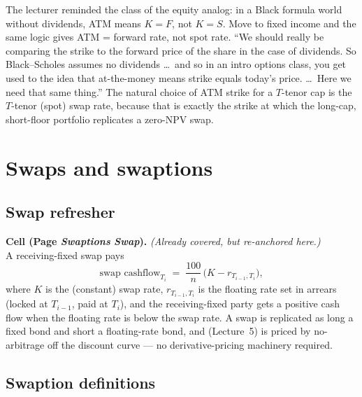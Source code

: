 The lecturer reminded the class of the equity analog: in a Black
formula world without dividends, ATM means $K = F$, not $K = S$.
Move to fixed income and the same logic gives ATM = forward rate, not
spot rate. ``We should really be comparing the strike to the forward
price of the share in the case of dividends. So Black--Scholes
assumes no dividends \ldots\ and so in an intro options class, you
get used to the idea that at-the-money means strike equals today's
price. \ldots\ Here we need that same thing.'' The natural choice
of ATM strike for a $T$-tenor cap is the $T$-tenor (spot) swap
rate, because that is exactly the strike at which the long-cap,
short-floor portfolio replicates a zero-NPV swap.

\section{Swaps and swaptions}\label{L6-sec:swaptions}

\subsection{Swap refresher}\label{L6-sec:swap-refresh}

\begin{keyblock}
\textbf{Cell (Page \emph{Swaptions} \textperiodcentered{}
\emph{Swap}).}
\emph{(Already covered, but re-anchored here.)}\\
A receiving-fixed swap pays
\[
  \text{swap cashflow}_{T_i} \;=\; \frac{100}{n}\,\bigl(K - r_{T_{i-1}, T_i}\bigr),
\]
where $K$ is the (constant) swap rate, $r_{T_{i-1}, T_i}$ is the
floating rate set in arrears (locked at $T_{i-1}$, paid at $T_i$),
and the receiving-fixed party gets a positive cash flow when the
floating rate is below the swap rate. A swap is replicated as long a
fixed bond and short a floating-rate bond, and (Lecture~5) is
priced by no-arbitrage off the discount curve --- no derivative-pricing
machinery required.
\end{keyblock}

\subsection{Swaption definitions}\label{L6-sec:swaption-defs}

